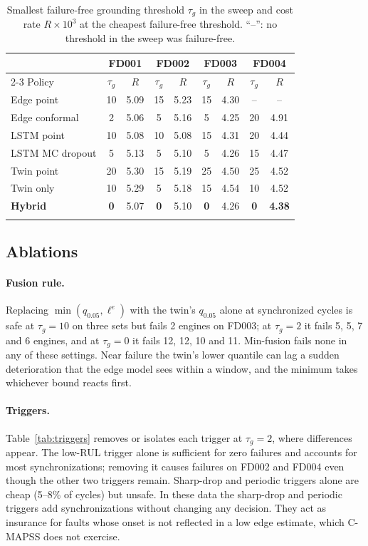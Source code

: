 \documentclass[pdflatex,sn-mathphys-num]{sn-jnl}
\begin{document}
\begin{table}[t]
\caption{Smallest failure-free grounding threshold $\tau_g$ in the sweep and cost rate $R\times10^3$ at the cheapest failure-free threshold. ``--'': no threshold in the sweep was failure-free.}\label{tab:safe}
\begin{tabular*}{\textwidth}{@{\extracolsep\fill}lcccccccc}
\toprule
& \multicolumn{2}{c}{FD001} & \multicolumn{2}{c}{FD002} & \multicolumn{2}{c}{FD003} & \multicolumn{2}{c}{FD004} \\
\cmidrule{2-3}\cmidrule{4-5}\cmidrule{6-7}\cmidrule{8-9}
Policy & $\tau_g$ & $R$ & $\tau_g$ & $R$ & $\tau_g$ & $R$ & $\tau_g$ & $R$ \\
\midrule
Edge point      & 10 & 5.09 & 15 & 5.23 & 15 & 4.30 & -- & -- \\
Edge conformal  & 2  & 5.06 & 5  & 5.16 & 5  & 4.25 & 20 & 4.91 \\
LSTM point      & 10 & 5.08 & 10 & 5.08 & 15 & 4.31 & 20 & 4.44 \\
LSTM MC dropout & 5  & 5.13 & 5  & 5.10 & 5  & 4.26 & 15 & 4.47 \\
Twin point      & 20 & 5.30 & 15 & 5.19 & 25 & 4.50 & 25 & 4.52 \\
Twin only       & 10 & 5.29 & 5  & 5.18 & 15 & 4.54 & 10 & 4.52 \\
\textbf{Hybrid} & \textbf{0} & 5.07 & \textbf{0} & 5.10 & \textbf{0} & 4.26 & \textbf{0} & \textbf{4.38} \\
\botrule
\end{tabular*}
\end{table}

\subsection{Ablations}
\paragraph{Fusion rule.} Replacing $\min(q_{0.05}, \ell^{e})$ with the twin's $q_{0.05}$ alone at synchronized cycles is safe at $\tau_g = 10$ on three sets but fails 2 engines on FD003; at $\tau_g = 2$ it fails 5, 5, 7 and 6 engines, and at $\tau_g = 0$ it fails 12, 12, 10 and 11. Min-fusion fails none in any of these settings. Near failure the twin's lower quantile can lag a sudden deterioration that the edge model sees within a window, and the minimum takes whichever bound reacts first.

\paragraph{Triggers.} Table~\ref{tab:triggers} removes or isolates each trigger at $\tau_g = 2$, where differences appear. The low-RUL trigger alone is sufficient for zero failures and accounts for most synchronizations; removing it causes failures on FD002 and FD004 even though the other two triggers remain. Sharp-drop and periodic triggers alone are cheap (5--8\% of cycles) but unsafe. In these data the sharp-drop and periodic triggers add synchronizations without changing any decision. They act as insurance for faults whose onset is not reflected in a low edge estimate, which C-MAPSS does not exercise.
\end{document}
